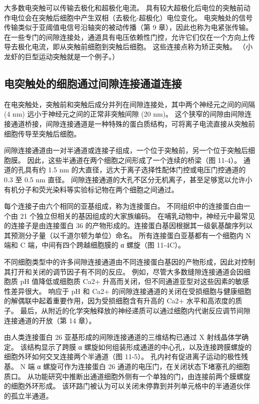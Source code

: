 大多数电突触可以传输去极化和超极化电流。 具有较大超极化后电位的突触前动作电位会在突触后细胞中产生双相（去极化-超极化）电位变化。 电突触处的信号传输类似于亚阈值电信号沿轴突的被动传播（第 9 章），因此也称为电紧张传输。 在一些专门的间隙连接处，通道具有电压依赖性门控，允许它们仅在一个方向上传导去极化电流，即从突触前细胞到突触后细胞。 这些连接点称为矫正突触。 （小龙虾的巨型运动突触就是一个例子。）

\subsection{电突触处的细胞通过间隙连接通道连接}
在电突触处，突触前和突触后成分并列在间隙连接处，其中两个神经元之间的间隔 (4 nm) 远小于神经元之间的正常非突触间隙 (20 nm)。 这个狭窄的间隙由间隙连接通道桥接，间隙连接通道是一种特殊的蛋白质结构，可将离子电流直接从突触前细胞传导至突触后细胞。

间隙连接通道由一对半通道或连接子组成，一个位于突触前，另一个位于突触后细胞膜。 因此，这些半通道在两个细胞之间形成了一个连续的桥梁（图 11-4）。 通道的孔具有约 1.5 nm 的大直径，远大于离子选择性配体门控或电压门控通道的 0.3 至 0.5 nm 直径。 间隙连接通道的大孔不区分无机离子，甚至足够宽以允许小有机分子和荧光染料等实验标记物在两个细胞之间通过。

每个连接子由六个相同的亚基组成，称为连接蛋白。 不同组织中的连接蛋白由一个由 21 个独立但相关的基因组成的大家族编码。 在哺乳动物中，神经元中最常见的连接子是由连接蛋白 36 的产物形成的。连接蛋白基因根据其一级氨基酸序列以其预测分子量（以千道尔顿为单位）命名。 所有连接蛋白亚基都有一个细胞内 N 端和 C 端，中间有四个跨越细胞膜的 α 螺旋（图 11-4C）。

不同细胞类型中的许多间隙连接通道由不同连接蛋白基因的产物形成，因此对控制其打开和关闭的调节因子有不同的反应。 例如，尽管大多数缝隙连接通道会因细胞质 pH 值降低或细胞质 Ca2+ 升高而关闭，但不同通道亚型对这些因素的敏感性差异很大。 响应于 pH 和 Ca2+ 的间隙连接通道的关闭在受损细胞与健康细胞的解偶联中起着重要作用，因为受损细胞含有升高的 Ca2+ 水平和高浓度的质子。 最后，从附近的化学突触释放的神经递质可以通过细胞内代谢反应调节间隙连接通道的开放（第 14 章）。

由人类连接蛋白 26 亚基形成的间隙连接通道的三维结构已通过 X 射线晶体学确定。 该结构显示了跨膜 α 螺旋如何组装形成通道的中心孔，以及连接跨膜螺旋的细胞外环如何交叉连接两个半通道（图 11-5）。 孔内衬有促进离子运动的极性残基。 N 端 α 螺旋可作为连接蛋白 26 通道的电压门，在关闭状态下堵塞孔的细胞质口。 从功能研究中推断出通道细胞外侧有一个单独的门，由连接前两个膜螺旋的细胞外环形成。 该环路门被认为可以关闭未停靠到并列单元格中的半通道伙伴的孤立半通道。

